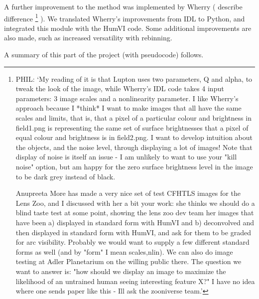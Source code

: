 \documentclass[letterpaper, 11pt]{article}
\def\MORE{{\color{red}{\bf MORE}}\xspace}
\begin{document}
A further improvement to the method was implemented by Wherry (\MORE describe difference
\footnote{PHIL: `My reading of it is that Lupton uses two parameters, Q and alpha, to
tweak the look of the image, while Wherry's IDL code takes 4 input
parameters: 3 image scales and a nonlinearity parameter.
I like Wherry's approach because I *think* I want to make images that
all have the same scales and limits, that is, that a pixel of a
particular colour and brightness in field1.png is representing the
same set of surface brightnesses that a pixel of equal colour and
brightness is in field2.png. I want to develop intuition about the
objects, and the noise level, through displaying a lot of images! Note
that display of noise is itself an issue - I am unlikely to want to
use your "kill noise" option, but am happy for the zero surface
brightness level in the image to be dark grey instead of black.

Anupreeta More has made a very nice set of test CFHTLS images for the
Lens Zoo, and I discussed with her a bit your work: she thinks we
should do a blind taste test at some point, showing the lens zoo dev
team her images that have been a) displayed in standard form with
HumVI and b) deconvolved and then
displayed in standard form with HumVI, and ask for them to be graded
for arc visibility. Probably we would want to supply a few different
standard forms as well (and by "form" I mean {scales,nlin}). We can
also do image testing at Adler Planetarium on the willing public
there. The question we want to answer is: "how should we display an
image to maximize the likelihood of an untrained human seeing
interesting feature X?"  I have no idea where one sends paper like
this - Ill ask the zooniverse team.'}
). We translated Wherry's improvements from IDL to Python, and integrated this module with the HumVI code. Some additional improvements are also made, such as increased versatility with rebinning.

A summary of this part of the project (with pseudocode) follows.
\end{document}
